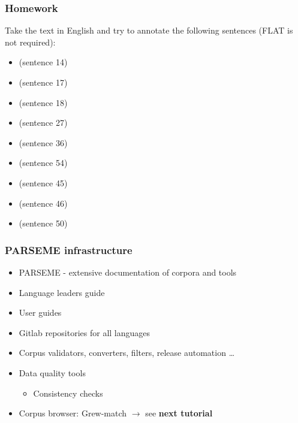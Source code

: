 \documentclass[xcolor=dvipsnames]{beamer}
\begin{document}
\begin{frame} 
\frametitle{Homework}

Take the text in English \href{https://github.com/UniDive/2023-unidive-webinar/blob/main/parseme-tutorial/en_pud-ud-test-first200.conllu}{} and try to annotate the following sentences (FLAT is not required):

\begin{block}{}
\begin{itemize}
\item {} (sentence 14)
\item {} (sentence 17)
\item {} (sentence 18)
\item {} (sentence 27)
\item {} (sentence 36)
\item {} (sentence 54)
\item {} (sentence 45)
\item {} (sentence 46)
\item {} (sentence 50)
\end{itemize}
\end{block}

\end{frame}

\begin{frame} 
\frametitle{PARSEME infrastructure}

\begin{block}{}
\begin{itemize}
\item PARSEME \href{https://gitlab.com/parseme/corpora/-/wikis}{\beamergotobutton{[wiki]}} - extensive documentation of corpora and tools  
\item Language leaders guide
\item User guides
\item Gitlab repositories for all languages %
\item Corpus validators, converters, filters, release automation \ldots
\item Data quality tools
   \begin{itemize}
   \item Consistency checks %
   \end{itemize} 
\item Corpus browser: Grew-match $\longrightarrow$ see \textbf{next tutorial}
\end{itemize}
\end{block}

\end{frame}
\end{document}
